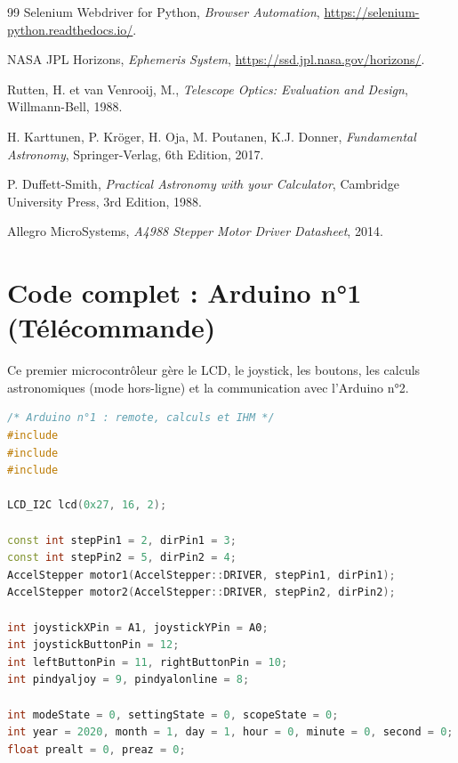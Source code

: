 \documentclass[12pt,a4paper]{report}
\begin{document}
\begin{enumerate}
\begin{enumerate}
\begin{thebibliography}{99}
Selenium Webdriver for Python, \textit{Browser Automation}, \url{https://selenium-python.readthedocs.io/}.

NASA JPL Horizons, \textit{Ephemeris System}, \url{https://ssd.jpl.nasa.gov/horizons/}.

Rutten, H. et van Venrooij, M., \textit{Telescope Optics: Evaluation and Design}, Willmann-Bell, 1988.

H. Karttunen, P. Kröger, H. Oja, M. Poutanen, K.J. Donner, \textit{Fundamental Astronomy}, Springer-Verlag, 6th Edition, 2017.

P. Duffett-Smith, \textit{Practical Astronomy with your Calculator}, Cambridge University Press, 3rd Edition, 1988.

Allegro MicroSystems, \textit{A4988 Stepper Motor Driver Datasheet}, 2014.

\end{thebibliography}

\clearpage

\appendix
\chapter{Code complet : Arduino n°1 (Télécommande)}
Ce premier microcontrôleur gère le LCD, le joystick, les boutons, les calculs astronomiques (mode hors-ligne) et la communication avec l'Arduino n°2.

\begin{lstlisting}[language=C++, caption={Firmware complet de l'Arduino n°1 (Télécommande, calculs et IHM).}, label={lst:arduino1}]
/* Arduino n°1 : remote, calculs et IHM */
#include 
#include 
#include 

LCD_I2C lcd(0x27, 16, 2);

const int stepPin1 = 2, dirPin1 = 3;
const int stepPin2 = 5, dirPin2 = 4;
AccelStepper motor1(AccelStepper::DRIVER, stepPin1, dirPin1);
AccelStepper motor2(AccelStepper::DRIVER, stepPin2, dirPin2);

int joystickXPin = A1, joystickYPin = A0;
int joystickButtonPin = 12;
int leftButtonPin = 11, rightButtonPin = 10;
int pindyaljoy = 9, pindyalonline = 8;

int modeState = 0, settingState = 0, scopeState = 0;
int year = 2020, month = 1, day = 1, hour = 0, minute = 0, second = 0;
float prealt = 0, preaz = 0;


\end{lstlisting}
\end{enumerate}
\end{enumerate}
\end{document}
